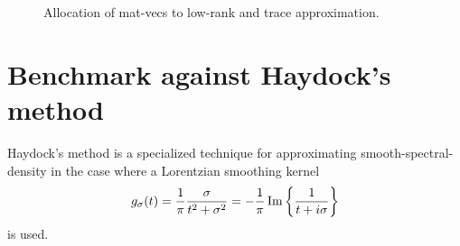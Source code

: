 \begin{figure}[ht]
    \centering
    
    \caption{Allocation of mat-vecs to low-rank and trace approximation.}
    \label{fig:5-experiments-electronic-structure-matvec-mixture}
\end{figure}


\section{Benchmark against Haydock's method}
\label{sec:5-experiments-haydock-method}

Haydock's method \cite{haydock1972electronic,lin2016review} is a specialized technique for approximating \gls{smooth-spectral-density}
in the case where a Lorentzian smoothing kernel
\begin{equation}
    g_{\sigma}(t) = \frac{1}{\pi} \frac{\sigma}{t^2 + \sigma^2} = -\frac{1}{\pi} \operatorname{Im}\left\{ \frac{1}{t + i\sigma} \right\}
    \label{equ:5-experiments-cauchy-kernel}
\end{equation}
is used.

